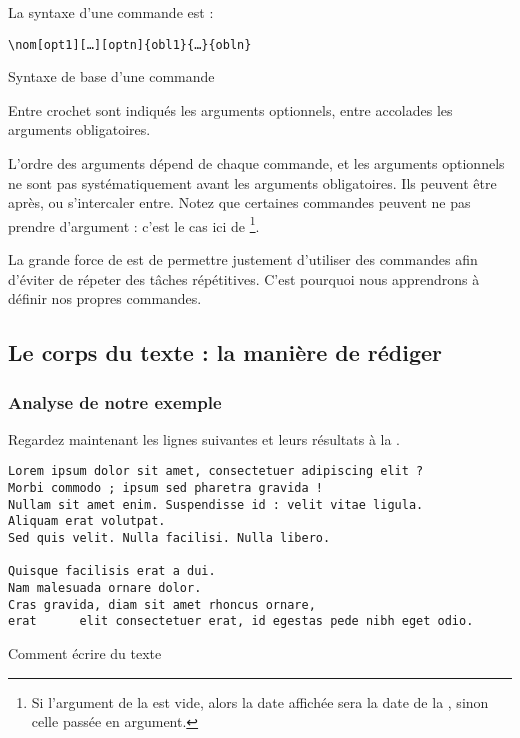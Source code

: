 La syntaxe d'une commande est :


\begin{listing}[ht]

\begin{verbatim}
\nom[opt1][…][optn]{obl1}{…}{obln}
\end{verbatim}
\caption{Syntaxe de base d'une commande}
\end{listing}

Entre crochet sont indiqués les arguments optionnels, entre accolades les arguments obligatoires.




L'ordre des arguments dépend de chaque commande, et les arguments optionnels ne sont pas systématiquement avant les arguments obligatoires. Ils peuvent être après, ou s'intercaler entre. Notez que certaines commandes peuvent ne pas prendre d'argument : c'est le cas ici de \footnote{Si l'argument de la   est vide, alors la date affichée  sera la date de la , sinon celle passée en argument.}.

La grande force de \logiciel{\LaTeX} est de permettre justement d'utiliser des commandes afin d'éviter de répeter des tâches répétitives. C'est pourquoi nous apprendrons à définir nos propres commandes.



\subsection{Le corps du texte : la manière de rédiger}

\subsubsection{Analyse de notre exemple}
Regardez maintenant les lignes suivantes et leurs résultats à la .

\begin{listing}[ht]
\begin{verbatim}
Lorem ipsum dolor sit amet, consectetuer adipiscing elit ?
Morbi commodo ; ipsum sed pharetra gravida !
Nullam sit amet enim. Suspendisse id : velit vitae ligula.
Aliquam erat volutpat.
Sed quis velit. Nulla facilisi. Nulla libero. 

Quisque facilisis erat a dui.
Nam malesuada ornare dolor.
Cras gravida, diam sit amet rhoncus ornare, 
erat      elit consectetuer erat, id egestas pede nibh eget odio.
\end{verbatim}
\caption{Comment écrire du texte}
\end{listing}

